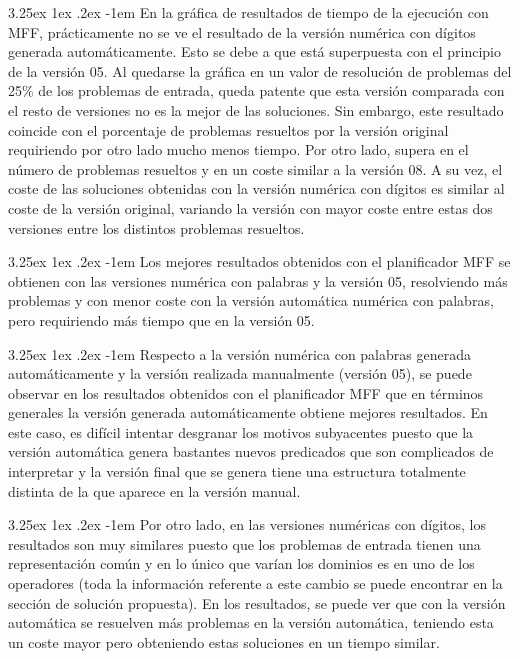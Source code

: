 \documentclass{article}
\makeatletter
\renewcommand\paragraph{\@startsection{paragraph}{5}{\z@}%
  {3.25ex \@plus1ex \@minus.2ex}%
  {-1em}%
  {\normalfont\normalsize\bfseries}}
\makeatother
\begin{document}
\pagebreak

\paragraph{}
En la gráfica de resultados de tiempo de la ejecución con MFF, prácticamente no se ve el resultado de la versión numérica con dígitos generada automáticamente. Esto se debe a que está superpuesta con el principio de la versión 05. Al quedarse la gráfica en un valor de resolución de problemas del 25\% de los problemas de entrada, queda patente que esta versión comparada con el resto de versiones no es la mejor de las soluciones. Sin embargo, este resultado coincide con el porcentaje de problemas resueltos por la versión original requiriendo por otro lado mucho menos tiempo. Por otro lado, supera en el número de problemas resueltos y en un coste similar a la versión 08. A su vez, el coste de las soluciones obtenidas con la versión numérica con dígitos es similar al coste de la versión original, variando la versión con mayor coste entre estas dos versiones entre los distintos problemas resueltos.

\paragraph{}
Los mejores resultados obtenidos con el planificador MFF se obtienen con las versiones numérica con palabras y la versión 05, resolviendo más problemas y con menor coste con la versión automática numérica con palabras, pero requiriendo más tiempo que en la versión 05.

\paragraph{}
Respecto a la versión numérica con palabras generada automáticamente y la versión realizada manualmente (versión 05), se puede observar en los resultados obtenidos con el planificador MFF que en términos generales la versión generada automáticamente obtiene mejores resultados. En este caso, es difícil intentar desgranar los motivos subyacentes puesto que la versión automática genera bastantes nuevos predicados que son complicados de interpretar y la versión final que se genera tiene una estructura totalmente distinta de la que aparece en la versión manual.

\paragraph{}
Por otro lado, en las versiones numéricas con dígitos, los resultados son muy similares puesto que los problemas de entrada tienen una representación común y en lo único que varían los dominios es en uno de los operadores (toda la información referente a este cambio se puede encontrar en la sección de solución propuesta). En los resultados, se puede ver que con la versión automática se resuelven más problemas en la versión automática, teniendo esta un coste mayor pero obteniendo estas soluciones en un tiempo similar.
\end{document}
